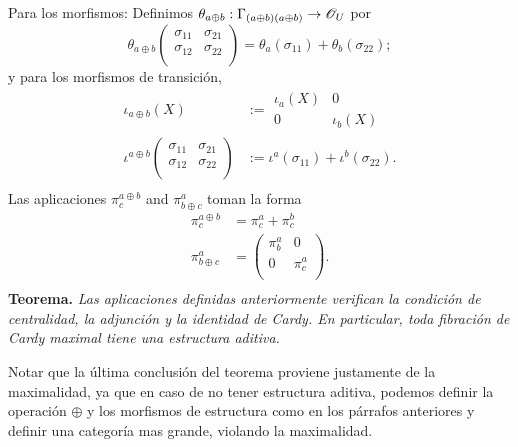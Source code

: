 {Para los morfismos: Definimos $\theta_{a\oplus b}:\Gamma_{(a\oplus b)(a\oplus b)}\to \mathscr{O}_U$ por
$$
\theta_{a\oplus b}\left (\begin{smallmatrix} \sigma_{11} & \sigma_{21} \\ \sigma_{12} & \sigma_{22} \\ \end{smallmatrix} \right )=\theta_{a}(\sigma_{11})+\theta_b(\sigma_{22});
$$
y para los morfismos de transici\'on,
$$
\begin{aligned}
\iota_{a\oplus b}(X) &:=\begin{smallmatrix} \iota_a(X) & 0 \\ 0 & \iota_b(X) \end{smallmatrix} \\
\iota^{a\oplus b}\left (\begin{smallmatrix} \sigma_{11} & \sigma_{21} \\ \sigma_{12} & \sigma_{22} \\ \end{smallmatrix} \right ) &:= \iota^a(\sigma_{11})+\iota^b(\sigma_{22}). \\
\end{aligned}
$$
Las aplicaciones $\pi^{a\oplus b}_c$ and $\pi^a_{b\oplus c}$ toman la forma
$$
\begin{aligned}
\pi^{a\oplus b}_c &= \pi^a_c+\pi^b_c \\
\pi^a_{b\oplus c} &= \left (\begin{smallmatrix} \pi^a_b & 0 \\ 0 & \pi^a_c \\ \end{smallmatrix} \right ). \\
\end{aligned}
$$
{\bf Teorema.} {\it Las aplicaciones definidas anteriormente verifican la condici\'on de centralidad, la adjunci\'on y la identidad de Cardy. En particular, toda fibraci\'on de Cardy maximal tiene una estructura aditiva.}
\medskip

Notar que la \'ultima conclusi\'on del teorema proviene justamente de la maximalidad, ya que en caso de no tener estructura aditiva, podemos definir la operaci\'on $\oplus$ y los morfismos de estructura como en los p\'arrafos anteriores y definir una categor\'ia mas grande, violando la maximalidad.
\medskip

}
